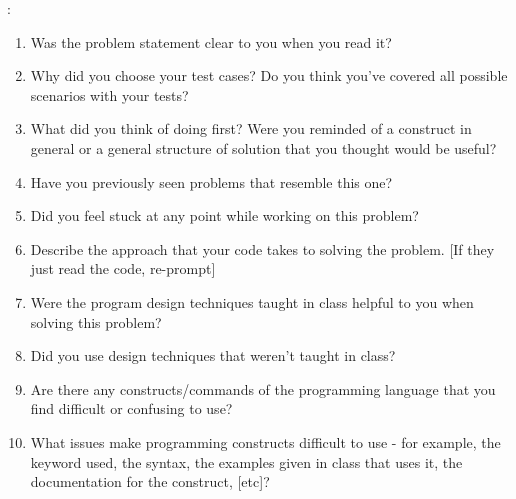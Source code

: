 :
\begin{enumerate}[leftmargin=*]

\item Was the problem statement clear to you when you read it?

\item Why did you choose your test cases? Do you think you've covered
  all possible scenarios with your tests?

\item What did you think of doing first? Were you reminded of a construct in general or a general structure of solution that you thought would be useful?

\item Have you previously seen problems that resemble this one?

\item Did you feel stuck at any point while working on this problem?

\item Describe the approach that your code takes to solving the
  problem. [If they just read the code, re-prompt]

\item Were the program design techniques taught in class helpful to
  you when solving this problem?

\item Did you use design techniques that weren't taught
  in class?

\item Are there any constructs/commands of the programming language
  that you find difficult or confusing to use?  %

\item What issues make programming constructs difficult to use - for
  example, the keyword used, the syntax, the examples given in class
  that uses it, the documentation for the construct, [etc]?

\end{enumerate}

